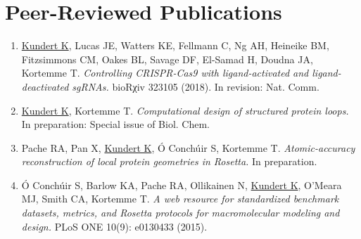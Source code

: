 \section{Peer-Reviewed Publications}

\begin{enumerate}

\item \underline{Kundert K}, Lucas JE, Watters KE, Fellmann C, Ng AH, Heineike 
    BM, Fitzsimmons CM, Oakes BL, Savage DF, El-Samad H, Doudna JA, Kortemme T.  
        \emph{Controlling CRISPR-Cas9 with ligand-activated and 
        ligand-deactivated sgRNAs.}  bioRχiv 323105 (2018).  In revision: Nat. 
        Comm.

\item \underline{Kundert K}, Kortemme T.  \emph{Computational design of 
    structured protein loops.}  In preparation: Special issue of Biol. Chem.

\item Pache RA, Pan X, \underline{Kundert K}, Ó Conchúir S, Kortemme T.  
    \emph{Atomic-accuracy reconstruction of local protein geometries in 
        Rosetta.}  In preparation.

\item Ó Conchúir S, Barlow KA, Pache RA, Ollikainen N, \underline{Kundert K}, 
    O'Meara MJ, Smith CA, Kortemme T.  \emph{A web resource for standardized 
        benchmark datasets, metrics, and Rosetta protocols for macromolecular 
        modeling and design.}  PLoS ONE 10(9): e0130433 (2015).

\end{enumerate}


